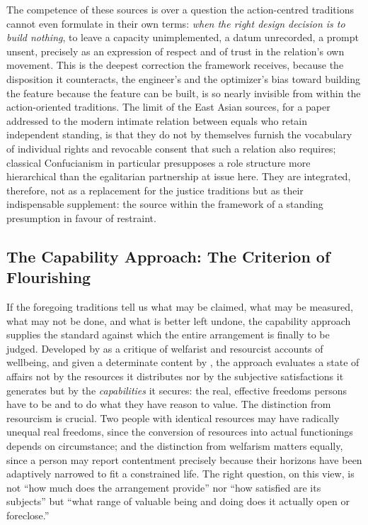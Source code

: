 \documentclass[11pt,a4paper]{article}
\begin{document}
The competence of these sources is over a question the action-centred traditions cannot even formulate in their own terms: \emph{when the right design decision is to build nothing}, to leave a capacity unimplemented, a datum unrecorded, a prompt unsent, precisely as an expression of respect and of trust in the relation's own movement. This is the deepest correction the framework receives, because the disposition it counteracts, the engineer's and the optimizer's bias toward building the feature because the feature can be built, is so nearly invisible from within the action-oriented traditions. The limit of the East Asian sources, for a paper addressed to the modern intimate relation between equals who retain independent standing, is that they do not by themselves furnish the vocabulary of individual rights and revocable consent that such a relation also requires; classical Confucianism in particular presupposes a role structure more hierarchical than the egalitarian partnership at issue here. They are integrated, therefore, not as a replacement for the justice traditions but as their indispensable supplement: the source within the framework of a standing presumption in favour of restraint.

\subsection{The Capability Approach: The Criterion of Flourishing}\label{p01:sec:capability}

If the foregoing traditions tell us what may be claimed, what may be measured, what may not be done, and what is better left undone, the capability approach supplies the standard against which the entire arrangement is finally to be judged. Developed by \textcite{sen1999development} as a critique of welfarist and resourcist accounts of wellbeing, and given a determinate content by \textcite{nussbaum2000women}, the approach evaluates a state of affairs not by the resources it distributes nor by the subjective satisfactions it generates but by the \emph{capabilities} it secures: the real, effective freedoms persons have to be and to do what they have reason to value. The distinction from resourcism is crucial. Two people with identical resources may have radically unequal real freedoms, since the conversion of resources into actual functionings depends on circumstance; and the distinction from welfarism matters equally, since a person may report contentment precisely because their horizons have been adaptively narrowed to fit a constrained life. The right question, on this view, is not ``how much does the arrangement provide'' nor ``how satisfied are its subjects'' but ``what range of valuable being and doing does it actually open or foreclose.''
\end{document}
